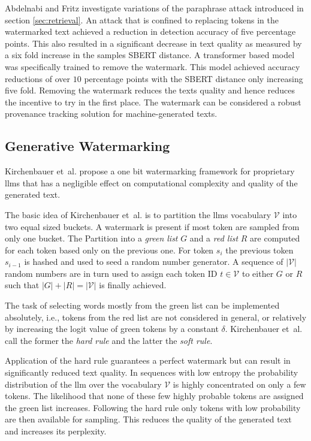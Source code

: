     Abdelnabi and Fritz \cite{abdelnabi2021adversarial} investigate variations of the paraphrase attack introduced in section \ref{sec:retrieval}.
    An attack that is confined to replacing tokens in the watermarked text achieved a reduction in detection accuracy of five percentage points.
    This also resulted in a significant decrease in text quality as measured by a six fold increase in the samples SBERT distance.
    A transformer based model was specifically trained to remove the watermark.
    This model achieved accuracy reductions of over $10$ percentage points with the SBERT distance only increasing five fold.
    Removing the watermark reduces the texts quality and hence reduces the incentive to try in the first place.
    The watermark can be considered a robust provenance tracking solution for machine-generated texts.
    
    \subsection{Generative Watermarking}
    \label{sec:whileGeneration}
	Kirchenbauer et~al.\cite{kirchenbauer2023watermark} propose a one bit watermarking framework for proprietary \acp{llm} 
	that has a negligible effect on computational complexity and quality of the generated text. 

    The basic idea of Kirchenbauer et~al.\cite{kirchenbauer2023watermark} is to partition the \acp{llm} vocabulary $\mathcal{V}$ into two equal sized buckets. 
	A watermark is present if most token are sampled from only one bucket. 
	The Partition into a \emph{green list} $G$ and a \emph{red list} $R$ are computed for each token based only on the previous one.
	For token $s_{i}$ the previous token $s_{i-1}$ is hashed and used to seed a random number generator. 
	A sequence of $|\mathcal{V}|$ random numbers are in turn used to assign each token ID $t \in \mathcal{V}$ to either $G$ or $R$ such that $|G| + |R| = |\mathcal{V}|$ is finally achieved. 

    The task of selecting words mostly from the green list can be implemented absolutely, i.e., tokens from the red list are not considered in general, 
	or relatively by increasing the logit value of green tokens by a constant $\delta$. 
	Kirchenbauer et~al.\cite{kirchenbauer2023watermark} call the former the \emph{hard rule} and the latter the \emph{soft rule}.

    Application of the hard rule guarantees a perfect watermark but can result in significantly reduced text quality. 
	In sequences with low entropy the probability distribution of the \ac{llm} over the vocabulary $\mathcal{V}$ is highly concentrated on only a few tokens. 
	The likelihood that none of these few highly probable tokens are assigned the green list increases. 
	Following the hard rule only tokens with low probability are then available for sampling. 
	This reduces the quality of the generated text and increases its perplexity. 

